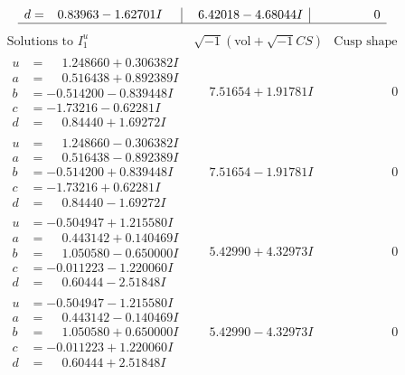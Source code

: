 \documentclass[1p]{elsarticle_modified}
\theoremstyle{definition}
\newcommand{\I}{\sqrt{-1}}
\begin{document}
$$\begin{array}{c|c|c}
\begin{aligned}
d &= \phantom{-}0.83963 - 1.62701 I\end{aligned}
 & \phantom{-}6.42018 - 4.68044 I & \phantom{-0.000000 } 0\\
 \hline 
 \end{array}$$\newpage$$\begin{array}{c|c|c}  
\text{Solutions to }I^u_{1}& \I (\text{vol} + \sqrt{-1}CS) & \text{Cusp shape}\\
 \hline 
\begin{aligned}
u &= \phantom{-}1.248660 + 0.306382 I \\
a &= \phantom{-}0.516438 + 0.892389 I \\
b &= -0.514200 - 0.839448 I \\
c &= -1.73216 - 0.62281 I \\
d &= \phantom{-}0.84440 + 1.69272 I\end{aligned}
 & \phantom{-}7.51654 + 1.91781 I & \phantom{-0.000000 } 0 \\ \hline\begin{aligned}
u &= \phantom{-}1.248660 - 0.306382 I \\
a &= \phantom{-}0.516438 - 0.892389 I \\
b &= -0.514200 + 0.839448 I \\
c &= -1.73216 + 0.62281 I \\
d &= \phantom{-}0.84440 - 1.69272 I\end{aligned}
 & \phantom{-}7.51654 - 1.91781 I & \phantom{-0.000000 } 0 \\ \hline\begin{aligned}
u &= -0.504947 + 1.215580 I \\
a &= \phantom{-}0.443142 + 0.140469 I \\
b &= \phantom{-}1.050580 - 0.650000 I \\
c &= -0.011223 - 1.220060 I \\
d &= \phantom{-}0.60444 - 2.51848 I\end{aligned}
 & \phantom{-}5.42990 + 4.32973 I & \phantom{-0.000000 } 0 \\ \hline\begin{aligned}
u &= -0.504947 - 1.215580 I \\
a &= \phantom{-}0.443142 - 0.140469 I \\
b &= \phantom{-}1.050580 + 0.650000 I \\
c &= -0.011223 + 1.220060 I \\
d &= \phantom{-}0.60444 + 2.51848 I\end{aligned}
 & \phantom{-}5.42990 - 4.32973 I & \phantom{-0.000000 } 0 \\ \hline\begin{aligned}

\end{aligned}
\end{array}$$
\end{document}
